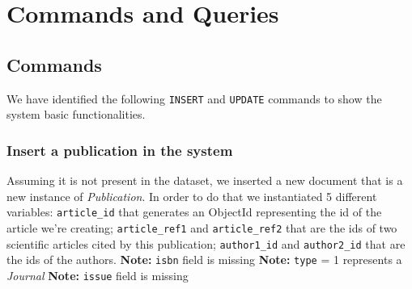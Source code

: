 \documentclass{Configuration_Files/PoliMi3i_thesis}
\begin{document}
\chapter{Commands and Queries}
\label{ch:ceq}
\section{Commands}
We have identified the following \verb |INSERT| and \verb |UPDATE| commands to show the system basic functionalities.

\subsection{Insert a publication in the system}
\label{pub_insert}
Assuming it is not present in the dataset, we inserted a new document that is a new instance of \emph{Publication}.
In order to do that we instantiated 5 different variables: \verb |article_id| that generates an ObjectId representing
the id of the article we're creating; \verb |article_ref1| and \verb |article_ref2| that are the ids of two scientific
articles cited by this publication; \verb |author1_id| and \verb |author2_id| that are the ids of the authors.\newline
\textbf{Note:} \verb |isbn| field is missing \newline
\textbf{Note:} \verb |type| = 1 represents a \emph{Journal} \newline
\textbf{Note:} \verb |issue| field is missing
\end{document}
